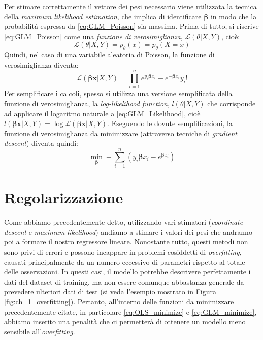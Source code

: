 Per stimare correttamente il vettore dei pesi necessario viene utilizzata la tecnica della \textit{maximum likelihood 
estimation}, che implica di identificare $\bm{\beta}$ in modo che la probabilità espressa da \eqref{eq:GLM_Poisson} sia
massima. Prima di tutto, si riscrive \eqref{eq:GLM_Poisson} come una \textit{funzione di verosimiglianza}, $\mathcal{L}(\theta | X, Y)$, cioè:
\begin{equation}
\mathcal{L}(\theta | X, Y) = p_{\theta}(x) = p_{\theta}(X=x)
\end{equation}
Quindi, nel caso di una variabile aleatoria di Poisson, la funzione di verosimiglianza diventa:
\begin{equation}
\mathcal{L}(\bm{\beta x}  | X, Y ) = \prod_{i=1}^n {e^{y_i \bm{\beta} x_i}-e^{-\bm{\beta} x_i}}{y_i!} \label{eq:GLM_Likelihood}
\end{equation}
Per semplificare i calcoli, spesso si utilizza una versione semplificata della funzione di verosimiglianza, la \textit{log-likelihood function}, $l(\theta | X, Y)$ che corrisponde ad applicare il logaritmo naturale a \eqref{eq:GLM_Likelihood}, cioè 
$l(\bm{\beta x}  | X, Y) = \log{\mathcal{L}(\bm{\beta x}  | X, Y )}$. 
Eseguendo le dovute semplificazioni, la funzione di verosimiglianza da minimizzare (attraverso tecniche di \textit{gradient descent}) diventa quindi:
\begin{equation}
	\min_{\bm{\beta}} -\sum_{i=1}^n (y_i\bm{\beta} x_i - e^{\bm{\beta} x_i} ) \label{eq:GLM_minimize}
\end{equation} 

\section{Regolarizzazione}
\bigskip

Come abbiamo precedentemente detto, utilizzando vari stimatori (\textit{coordinate descent} e \textit{maximum likelihood}) 
andiamo a stimare i valori dei pesi che andranno poi a formare il nostro regressore lineare. Nonostante tutto, questi metodi 
non sono privi di errori e possono incappare in problemi cosiddetti di \textit{overfitting}, causati principalmente da un 
numero eccessivo di parametri rispetto al totale delle osservazioni. In questi casi, il modello potrebbe descrivere 
perfettamente i dati del dataset di training, ma non essere comunque abbastanza generale da prevedere ulteriori dati di test (si veda l'esempio mostrato in Figura \ref{fig:ch_1_overfitting}). 
Pertanto, all'interno delle funzioni da minimizzare precedentemente citate, in particolare \eqref{eq:OLS_minimize} e 
\eqref{eq:GLM_minimize}, abbiamo inserito una penalità che ci permetterà di ottenere un modello meno sensibile 
all'\textit{overfitting}. 
\bigskip 

